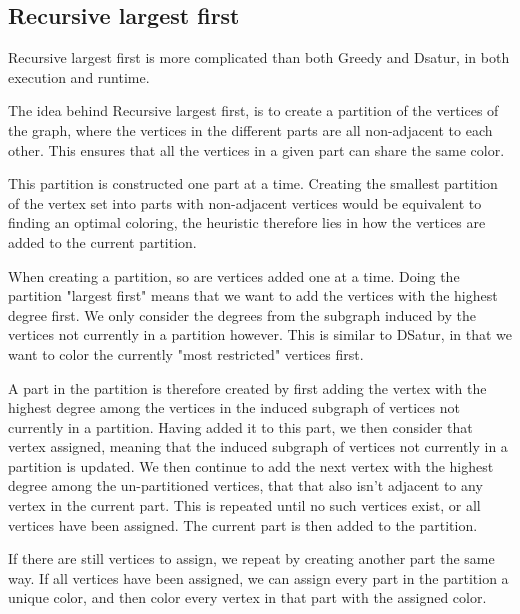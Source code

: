 \documentclass[a4paper]{article}
\begin{document}
\subsection{Recursive largest first}

Recursive largest first is more complicated than both Greedy and Dsatur, in both
execution and runtime. 

The idea behind Recursive largest first, is to create a partition of the
vertices of the graph, where the vertices in the different parts are all
non-adjacent to each other. This ensures that all the vertices in a given part
can share the same color. 

This partition is constructed one part at a time. Creating the smallest partition of the
vertex set into parts with non-adjacent vertices would be equivalent to finding
an optimal coloring, the heuristic therefore lies in how the vertices are added 
to the current partition.

When creating a partition, so are vertices added one at a time. Doing the
partition "largest first" means that we want to add the vertices with the highest
degree first. We only consider the degrees from the subgraph induced
by the vertices not currently in a partition however. This is similar to DSatur, in that
we want to color the currently "most restricted" vertices first.

A part in the partition is therefore created by first adding the vertex with the highest
degree among the vertices in the induced subgraph of vertices not currently in a
partition. Having added it to this part, we then consider that vertex
assigned, meaning that the induced subgraph of vertices not
currently in a partition is updated. We then continue to add the next vertex
with the highest degree among the un-partitioned vertices, that that also isn't adjacent 
to any vertex in the current part. This is repeated until no such vertices
exist, or all vertices have been assigned. The current part is then added to the
partition.

If there are still vertices to assign, we repeat by creating another part the
same way. If all vertices have been assigned, we can assign every 
part in the partition a unique color, and then color every vertex in that part
with the assigned color.
\end{document}
